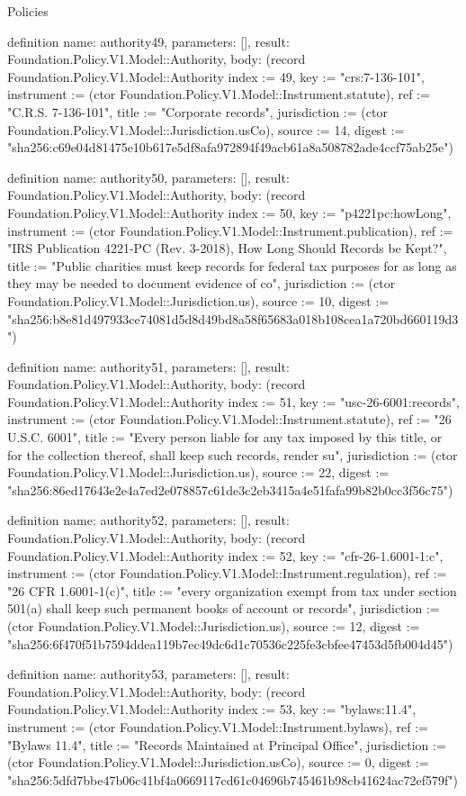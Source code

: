 \begin{lexlean}{Policies}
\begin{semanticmodule}
definition{
  name: authority49,
  parameters: [],
  result: Foundation.Policy.V1.Model::Authority,
  body: (record Foundation.Policy.V1.Model::Authority {index := 49, key := "crs:7-136-101", instrument := (ctor Foundation.Policy.V1.Model::Instrument.statute), ref := "C.R.S. 7-136-101", title := "Corporate records", jurisdiction := (ctor Foundation.Policy.V1.Model::Jurisdiction.usCo), source := 14, digest := "sha256:c69e04d81475e10b617e5df8afa972894f49acb61a8a508782ade4ccf75ab25e"})
}

definition{
  name: authority50,
  parameters: [],
  result: Foundation.Policy.V1.Model::Authority,
  body: (record Foundation.Policy.V1.Model::Authority {index := 50, key := "p4221pc:howLong", instrument := (ctor Foundation.Policy.V1.Model::Instrument.publication), ref := "IRS Publication 4221-PC (Rev. 3-2018), How Long Should Records be Kept?", title := "Public charities must keep records for federal tax purposes for as long as they may be needed to document evidence of co", jurisdiction := (ctor Foundation.Policy.V1.Model::Jurisdiction.us), source := 10, digest := "sha256:b8e81d497933ce74081d5d8d49bd8a58f65683a018b108cea1a720bd660119d3"})
}

definition{
  name: authority51,
  parameters: [],
  result: Foundation.Policy.V1.Model::Authority,
  body: (record Foundation.Policy.V1.Model::Authority {index := 51, key := "usc-26-6001:records", instrument := (ctor Foundation.Policy.V1.Model::Instrument.statute), ref := "26 U.S.C. 6001", title := "Every person liable for any tax imposed by this title, or for the collection thereof, shall keep such records, render su", jurisdiction := (ctor Foundation.Policy.V1.Model::Jurisdiction.us), source := 22, digest := "sha256:86ed17643e2e4a7ed2e078857c61de3c2eb3415a4e51fafa99b82b0cc3f56c75"})
}

definition{
  name: authority52,
  parameters: [],
  result: Foundation.Policy.V1.Model::Authority,
  body: (record Foundation.Policy.V1.Model::Authority {index := 52, key := "cfr-26-1.6001-1:c", instrument := (ctor Foundation.Policy.V1.Model::Instrument.regulation), ref := "26 CFR 1.6001-1(c)", title := "every organization exempt from tax under section 501(a) shall keep such permanent books of account or records", jurisdiction := (ctor Foundation.Policy.V1.Model::Jurisdiction.us), source := 12, digest := "sha256:6f470f51b7594ddea119b7ec49dc6d1c70536c225fe3cbfee47453d5fb004d45"})
}

definition{
  name: authority53,
  parameters: [],
  result: Foundation.Policy.V1.Model::Authority,
  body: (record Foundation.Policy.V1.Model::Authority {index := 53, key := "bylaws:11.4", instrument := (ctor Foundation.Policy.V1.Model::Instrument.bylaws), ref := "Bylaws 11.4", title := "Records Maintained at Principal Office", jurisdiction := (ctor Foundation.Policy.V1.Model::Jurisdiction.usCo), source := 0, digest := "sha256:5dfd7bbe47b06c41bf4a0669117cd61c04696b745461b98cb41624ac72ef579f"})
}


\end{semanticmodule}
\end{lexlean}
